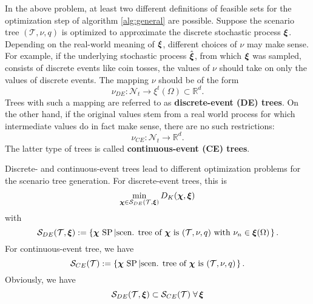 In the above problem, at least two different definitions of feasible sets for the optimization step of algorithm \ref{alg:general} are possible.
Suppose the scenario tree $(\mathcal{T}, \nu, q)$ is optimized to approximate the discrete stochastic process $\boldsymbol\xi$.
Depending on the real-world meaning of $\boldsymbol\xi$, different choices of $\nu$ may make sense.
For example, if the underlying stochastic process $\hat{\boldsymbol\xi}$, from which $\boldsymbol\xi$ was sampled, consists of discrete events like coin tosses, the values of $\nu$ should take on only the values of discrete events.
The mapping $\nu$ should be of the form
\begin{equation}
  \label{eq:65}
  \nu_{DE}:\mathcal{N}_t\rightarrow \xi^t(\Omega)\subset\mathbb{R}^d.
\end{equation}
Trees with such a mapping are referred to as \textbf{discrete-event (DE) trees}.
On the other hand, if the original values stem from a real world process for which intermediate values do in fact make sense, there are no such restrictions:
\begin{equation}
  \label{eq:66}
  \nu_{CE}:\mathcal{N}_t\rightarrow \mathbb{R}^d.
\end{equation}
The latter type of trees is called \textbf{continuous-event (CE) trees}.

Discrete- and continuous-event trees lead to different optimization problems for the scenario tree generation.
For discrete-event trees, this is
\begin{equation}
  \label{eq:67}
  \min\limits_{\boldsymbol\chi\in \mathcal{S}_{DE}(\mathcal{T},\boldsymbol\xi)}D_K(\boldsymbol\chi, \boldsymbol\xi)
\end{equation}
with
\begin{equation}
  \label{eq:68}
  \mathcal{S}_{DE}(\mathcal{T},\boldsymbol\xi) := \left\{\boldsymbol\chi \text{ SP}\left|\text{scen. tree of }\boldsymbol\chi\text{ is } (\mathcal{T},\nu,q)\text{ with }\nu_n\in\boldsymbol\xi(\Omega)\right.\right\}.
\end{equation}
For continuous-event tree, we have
\begin{equation}
  \label{eq:69}
  \mathcal{S}_{CE}(\mathcal{T}) := \left\{\boldsymbol\chi\text{ SP}\left|\text{scen. tree of }\boldsymbol\chi\text{ is } (\mathcal{T},\nu,q)\right.\right\}.
\end{equation}
Obviously, we have
\begin{equation}
  \label{eq:70}
  \mathcal{S}_{DE}(\mathcal{T},\boldsymbol\xi) \subset   \mathcal{S}_{CE}(\mathcal{T}) \;\forall\,\boldsymbol\xi
\end{equation}


